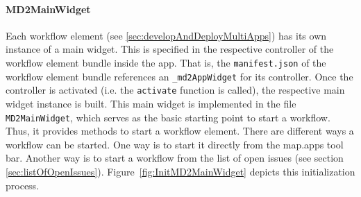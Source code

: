 \paragraph{MD2MainWidget}
Each workflow element (see \ref{sec:developAndDeployMultiApps}) has its own instance of a \MD main widget. This is specified in the respective controller of the workflow element bundle inside the app. That is, the \lstinline!manifest.json! of the workflow element bundle references an \lstinline!_md2AppWidget! for its controller. Once the controller is activated (i.e. the \lstinline!activate! function is called), the respective \MD main widget instance is built. This \MD main widget is implemented in the file \lstinline!MD2MainWidget!, which serves as the basic starting point to start a workflow. Thus, it provides methods to start a workflow element. There are different ways a workflow can be started. One way is to start it directly from the map.apps tool bar. Another way is to start a workflow from the list of open issues (see section \ref{sec:listOfOpenIssues}). Figure~\ref{fig:InitMD2MainWidget} depicts this initialization process.


